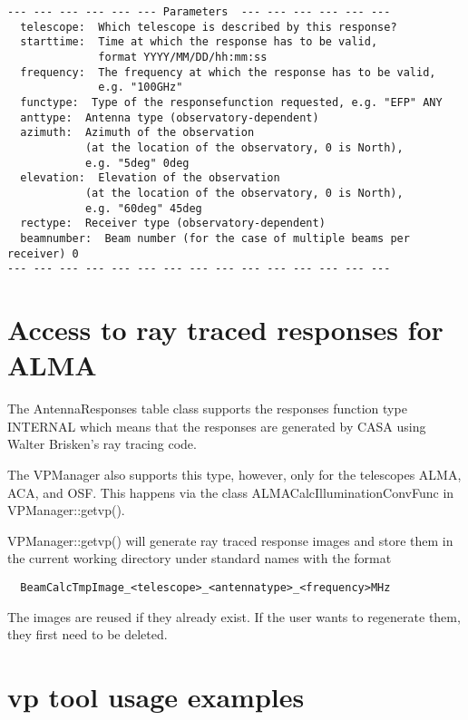 \documentclass[12pt]{article}
\begin{document}
\begin{description}
{\small
    \begin{verbatim}
--- --- --- --- --- --- Parameters  --- --- --- --- --- ---
  telescope:  Which telescope is described by this response? 
  starttime:  Time at which the response has to be valid, 
              format YYYY/MM/DD/hh:mm:ss 
  frequency:  The frequency at which the response has to be valid, 
              e.g. "100GHz" 
  functype:  Type of the responsefunction requested, e.g. "EFP" ANY 
  anttype:  Antenna type (observatory-dependent) 
  azimuth:  Azimuth of the observation 
            (at the location of the observatory, 0 is North), 
            e.g. "5deg" 0deg 
  elevation:  Elevation of the observation 
            (at the location of the observatory, 0 is North), 
            e.g. "60deg" 45deg 
  rectype:  Receiver type (observatory-dependent) 
  beamnumber:  Beam number (for the case of multiple beams per receiver) 0 
--- --- --- --- --- --- --- --- --- --- --- --- --- --- ---
\end{verbatim} 
} 

\end{description}

\section{Access to ray traced responses for ALMA}
\label{secrt}

The AntennaResponses table class supports the responses function type INTERNAL which
means that the responses are generated by CASA using Walter Brisken's ray tracing code.

The VPManager also supports this type, however, only for the telescopes ALMA, ACA, and OSF.
This happens via the class ALMACalcIlluminationConvFunc in VPManager::getvp().

VPManager::getvp() will generate ray traced response images and store them in the current
working directory under standard names with the format
\begin{verbatim}
  BeamCalcTmpImage_<telescope>_<antennatype>_<frequency>MHz
\end{verbatim}
The images are reused if they already exist.
If the user wants to regenerate them, they first need to be deleted.

\newpage
\appendix

\section{vp tool usage examples}
\label{appex}
\end{document}
